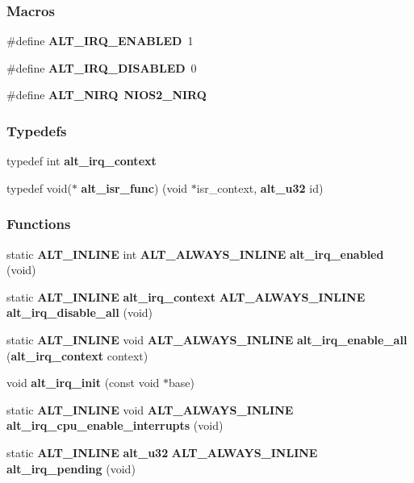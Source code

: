\subsubsection*{Macros}
\begin{DoxyCompactItemize}
\item 
\#define {\bf A\+L\+T\+\_\+\+I\+R\+Q\+\_\+\+E\+N\+A\+B\+L\+ED}~1
\item 
\#define {\bf A\+L\+T\+\_\+\+I\+R\+Q\+\_\+\+D\+I\+S\+A\+B\+L\+ED}~0
\item 
\#define {\bf A\+L\+T\+\_\+\+N\+I\+RQ}~{\bf N\+I\+O\+S2\+\_\+\+N\+I\+RQ}
\end{DoxyCompactItemize}
\subsubsection*{Typedefs}
\begin{DoxyCompactItemize}
\item 
typedef int {\bf alt\+\_\+irq\+\_\+context}
\item 
typedef void($\ast$ {\bf alt\+\_\+isr\+\_\+func}) (void $\ast$isr\+\_\+context, {\bf alt\+\_\+u32} id)
\end{DoxyCompactItemize}
\subsubsection*{Functions}
\begin{DoxyCompactItemize}
\item 
static {\bf A\+L\+T\+\_\+\+I\+N\+L\+I\+NE} int {\bf A\+L\+T\+\_\+\+A\+L\+W\+A\+Y\+S\+\_\+\+I\+N\+L\+I\+NE} {\bf alt\+\_\+irq\+\_\+enabled} (void)
\item 
static {\bf A\+L\+T\+\_\+\+I\+N\+L\+I\+NE} {\bf alt\+\_\+irq\+\_\+context} {\bf A\+L\+T\+\_\+\+A\+L\+W\+A\+Y\+S\+\_\+\+I\+N\+L\+I\+NE} {\bf alt\+\_\+irq\+\_\+disable\+\_\+all} (void)
\item 
static {\bf A\+L\+T\+\_\+\+I\+N\+L\+I\+NE} void {\bf A\+L\+T\+\_\+\+A\+L\+W\+A\+Y\+S\+\_\+\+I\+N\+L\+I\+NE} {\bf alt\+\_\+irq\+\_\+enable\+\_\+all} ({\bf alt\+\_\+irq\+\_\+context} context)
\item 
void {\bf alt\+\_\+irq\+\_\+init} (const void $\ast$base)
\item 
static {\bf A\+L\+T\+\_\+\+I\+N\+L\+I\+NE} void {\bf A\+L\+T\+\_\+\+A\+L\+W\+A\+Y\+S\+\_\+\+I\+N\+L\+I\+NE} {\bf alt\+\_\+irq\+\_\+cpu\+\_\+enable\+\_\+interrupts} (void)
\item 
static {\bf A\+L\+T\+\_\+\+I\+N\+L\+I\+NE} {\bf alt\+\_\+u32} {\bf A\+L\+T\+\_\+\+A\+L\+W\+A\+Y\+S\+\_\+\+I\+N\+L\+I\+NE} {\bf alt\+\_\+irq\+\_\+pending} (void)
\end{DoxyCompactItemize}


